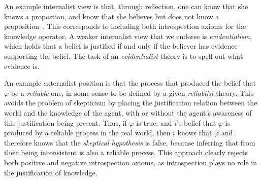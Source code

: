 An example internalist view is that, through reflection, one can know that she knows a propostion, and know that she believes but does not know a proposition~\cite{Prichard}. This corresponds to including both introspection axioms for the knowledge operator. A weaker internalist view that we endorse is \emph{evidentialism}, which holds that a belief is justified if and only if the believer has evidence supporting the belief. The task of an \emph{evidentialist} theory is to spell out what evidence is.

An example externalist position is that the process that produced the belief that $\varphi$ be a \emph{reliable} one, in some sense to be defined by a given \emph{reliablist} theory. This avoids the problem of skepticism by placing the justification relation between the world and the knowledge of the agent, with or without the agent's awareness of this justification being present. Thus, if $\varphi$ is true, and $i$'s belief that $\varphi$ is produced by a reliable process in the real world, then $i$ knows that $\varphi$ and therefore knows that the \emph{skeptical hypothesis} is false, because inferring that from their being inconsistent is also a reliable process. This approach clearly rejects both positive and negative introspection axioms, as introspection plays no role in the justification of knowledge.

